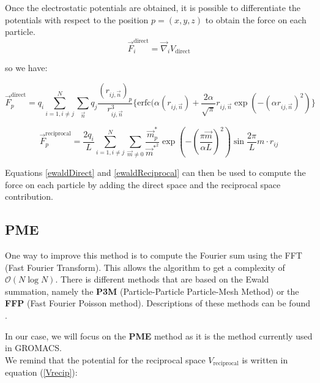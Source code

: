 \documentclass[11pt,twoside,a4paper]{report}
\begin{document}
Once the electrostatic potentials are obtained, it is possible to differentiate the potentials with respect to the position $p=(x,y,z)$ to obtain the force on each particle.\\

\begin{equation}
   \overrightarrow{F}_i^{\text{direct}} = \overrightarrow{\nabla}_i V_{\text{direct}} 
\end{equation}


so we have:

\begin{equation}
\label{ewaldDirect}
   \overrightarrow{F}_p^{\text{direct}} = q_i \sum\limits_{i=1,i\neq j}^N \sum\limits_{\vec{n}} q_j \frac{(r_{ij,\vec{n}})_p}{r_{ij,\vec{n}}^3}
   \{\text{erfc}(\alpha (r_{ij,\vec{n}}) + \frac{2\alpha}{\sqrt{\pi}} r_{ij,\vec{n}} \exp(-(\alpha r_{ij,\vec{n}})^2)\}
\end{equation}


\begin{equation}
\label{ewaldReciprocal}
   \overrightarrow{F}_p^{\text{reciprocal}} = \frac{2 q_i}{L} \sum\limits_{i=1,i\neq j}^N \sum_{\vec{m} \neq 0} \frac{\vec{m}_p^*}{\vec{m}^{*^2}} \exp{(-(\frac{\pi \vec{m}}{\alpha L})^2)}\sin{\frac{2\pi}{L} m \cdot r_{ij} }
\end{equation}

Equations \ref{ewaldDirect} and \ref{ewaldReciprocal} can then be used to compute the force on each particle by adding the direct space and the reciprocal space contribution.\\


\subsection{PME}
One way to improve this method is to compute the Fourier sum using the FFT (Fast Fourier Transform). This allows the algorithm to get a complexity of $\mathcal{O}(N\log N)$. There is different methods that are based on the Ewald summation, namely the \textbf{P3M} (Particle-Particle Particle-Mesh Method) or the \textbf{FFP} (Fast Fourier Poisson method). Descriptions of these methods can be found \cite{toukmaji1996ewald}. 

In our case, we will focus on the \textbf{PME} method as it is the method currently used in GROMACS. \\

We remind that the potential for the reciprocal space $V_{\text{reciprocal}}$ is written in equation (\ref{Vrecip}):
\end{document}

